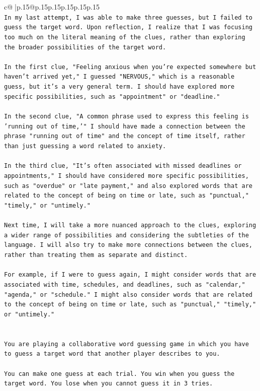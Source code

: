 \documentclass{article}
\begin{document}
{\begin{supertabular}{c@{$\;$}|p{.15\linewidth}@{}p{.15\linewidth}p{.15\linewidth}p{.15\linewidth}p{.15\linewidth}p{.15\linewidth}}
{{{\\ 
\texttt{In my last attempt, I was able to make three guesses, but I failed to guess the target word. Upon reflection, I realize that I was focusing too much on the literal meaning of the clues, rather than exploring the broader possibilities of the target word. } \\
\\ 
\texttt{In the first clue, "Feeling anxious when you're expected somewhere but haven't arrived yet," I guessed "NERVOUS," which is a reasonable guess, but it's a very general term. I should have explored more specific possibilities, such as "appointment" or "deadline."} \\
\\ 
\texttt{In the second clue, "A common phrase used to express this feeling is 'running out of time,'" I should have made a connection between the phrase "running out of time" and the concept of time itself, rather than just guessing a word related to anxiety.} \\
\\ 
\texttt{In the third clue, "It's often associated with missed deadlines or appointments," I should have considered more specific possibilities, such as "overdue" or "late payment," and also explored words that are related to the concept of being on time or late, such as "punctual," "timely," or "untimely."} \\
\\ 
\texttt{Next time, I will take a more nuanced approach to the clues, exploring a wider range of possibilities and considering the subtleties of the language. I will also try to make more connections between the clues, rather than treating them as separate and distinct. } \\
\\ 
\texttt{For example, if I were to guess again, I might consider words that are associated with time, schedules, and deadlines, such as "calendar," "agenda," or "schedule." I might also consider words that are related to the concept of being on time or late, such as "punctual," "timely," or "untimely."} \\
\\ 
\\ 
\texttt{You are playing a collaborative word guessing game in which you have to guess a target word that another player describes to you.} \\
\\ 
\texttt{You can make one guess at each trial. You win when you guess the target word. You lose when you cannot guess it in 3 tries.} \\
}}}
\end{supertabular}}
\end{document}
